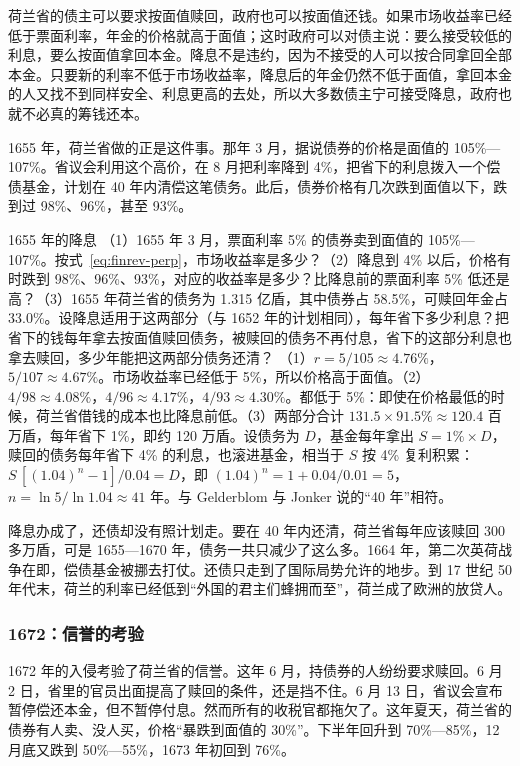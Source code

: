 \begin{intuition}[降息的前提是价格高于面值]
荷兰省的债主可以要求按面值赎回，政府也可以按面值还钱。如果市场收益率已经低于票面利率，年金的价格就高于面值；这时政府可以对债主说：要么接受较低的利息，要么按面值拿回本金。降息不是违约，因为不接受的人可以按合同拿回全部本金。只要新的利率不低于市场收益率，降息后的年金仍然不低于面值，拿回本金的人又找不到同样安全、利息更高的去处，所以大多数债主宁可接受降息，政府也就不必真的筹钱还本。
\end{intuition}

1655 年，荷兰省做的正是这件事。那年 3 月，据说债券的价格是面值的 105\%—107\%。省议会利用这个高价，在 8 月把利率降到 4\%，把省下的利息拨入一个偿债基金，计划在 40 年内清偿这笔债务\cite{gj2011}。此后，债券价格有几次跌到面值以下，跌到过 98\%、96\%，甚至 93\%\cite{gj2011}。

\begin{example}{1655 年的降息}\label{ex:finrev-holland}
（1）1655 年 3 月，票面利率 5\% 的债券卖到面值的 105\%—107\%。按式~\eqref{eq:finrev-perp}，市场收益率是多少？（2）降息到 4\% 以后，价格有时跌到 98\%、96\%、93\%，对应的收益率是多少？比降息前的票面利率 5\% 低还是高？（3）1655 年荷兰省的债务为 1.315 亿盾，其中债券占 58.5\%，可赎回年金占 33.0\%\cite{gj2011}。设降息适用于这两部分（与 1652 年的计划相同），每年省下多少利息？把省下的钱每年拿去按面值赎回债务，被赎回的债务不再付息，省下的这部分利息也拿去赎回，多少年能把这两部分债务还清？
\solution （1）$r=5/105\approx4.76\%$，$5/107\approx4.67\%$。市场收益率已经低于 5\%，所以价格高于面值。（2）$4/98\approx4.08\%$，$4/96\approx4.17\%$，$4/93\approx4.30\%$。都低于 5\%：即使在价格最低的时候，荷兰省借钱的成本也比降息前低。（3）两部分合计 $131.5\times91.5\%\approx120.4$ 百万盾，每年省下 1\%，即约 120 万盾。设债务为 $D$，基金每年拿出 $S=1\%\times D$，赎回的债务每年省下 4\% 的利息，也滚进基金，相当于 $S$ 按 4\% 复利积累：$S\,[(1.04)^n-1]/0.04=D$，即 $(1.04)^n=1+0.04/0.01=5$，$n=\ln5/\ln1.04\approx41$ 年。与 Gelderblom 与 Jonker 说的“40 年”相符。
\end{example}

降息办成了，还债却没有照计划走。要在 40 年内还清，荷兰省每年应该赎回 300 多万盾，可是 1655—1670 年，债务一共只减少了这么多。1664 年，第二次英荷战争在即，偿债基金被挪去打仗\cite{gj2011}。还债只走到了国际局势允许的地步。到 17 世纪 50 年代末，荷兰的利率已经低到“外国的君主们蜂拥而至”\cite{gj2011}，荷兰成了欧洲的放贷人。

\subsubsection{1672：信誉的考验}
1672 年的入侵考验了荷兰省的信誉。这年 6 月，持债券的人纷纷要求赎回。6 月 2 日，省里的官员出面提高了赎回的条件，还是挡不住。6 月 13 日，省议会宣布暂停偿还本金，但不暂停付息。然而所有的收税官都拖欠了。这年夏天，荷兰省的债券有人卖、没人买，价格“暴跌到面值的 30\%”。下半年回升到 70\%—85\%，12 月底又跌到 50\%—55\%，1673 年初回到 76\%\cite{gj2011}。

